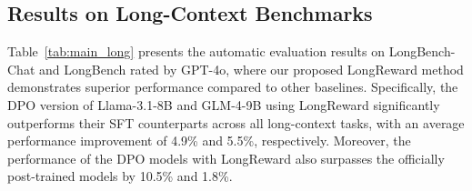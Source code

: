 \subsection{Results on Long-Context Benchmarks}
\label{sec:main_long}

Table~\ref{tab:main_long} presents the automatic evaluation results on LongBench-Chat and LongBench rated by GPT-4o, where our proposed LongReward method demonstrates superior performance compared to other baselines. Specifically, the DPO version of Llama-3.1-8B and GLM-4-9B using LongReward significantly outperforms their SFT counterparts across all long-context tasks, with an average performance improvement of 4.9\% and 5.5\%, respectively. Moreover, the performance of the DPO models with LongReward also surpasses the officially post-trained models by 10.5\% and 1.8\%.

